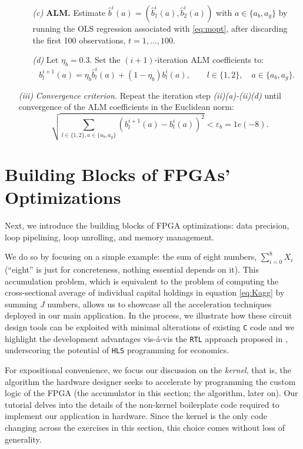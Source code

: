 \documentclass[12pt,american]{article}
\newcommand{\tollbetacode}{1e(-8)}
\begin{document}
\begin{itemize}
\begin{itemize}
\item [\textit{(c)}] \textbf{ALM.} Estimate $\hat{b}^{i}(a)=(\hat{b}^{i}_1(a),\hat{b}^{i}_2(a))$ with $a\in\{a_b,a_g\}$ by running the OLS regression associated with \eqref{eq:mopt}, after discarding the first 100 observations, $t=1,\ldots,100$.
\item [\textit{(d)}] Let $\eta_{b}=0.3$. Set the $(i+1)$-iteration ALM coefficients to:
\begin{equation*}
b^{i+1}_{l}(a)=\eta_{b}\hat{b}^{i}_{l}(a)+(1-\eta_{b})b^{i}_{l}(a), \qquad l\in\{1,2\}, \quad a\in\{a_b,a_g\}.  
\end{equation*}
\end{itemize}
\item [\textit{(iii)}] \textit{Convergence criterion.} Repeat the iteration step \textit{(ii)(a)-(ii)(d)} until convergence of the ALM coefficients in the Euclidean norm:
\begin{equation}
\sqrt{\sum\limits_{l\in\{1,2\},a\in\{a_b,a_g\}}(b^{i+1}_{l}(a)-b^{i}_{l}(a))^2}<\varepsilon_b =\tollbetacode.\label{eq:betaconv}
\end{equation}
\end{itemize}

\section{Building Blocks of FPGAs' Optimizations}\label{sec:buiblo}

Next, we introduce the building blocks of FPGA optimizations: data precision, loop pipelining, loop unrolling, and memory management. 

We do so by focusing on a simple example: the sum of eight numbers, $\sum_{i=0}^{8} X_i$ (``eight'' is just for concreteness, nothing essential depends on it). This accumulation problem, which is equivalent to the problem of computing the cross-sectional average of individual capital holdings in equation \eqref{eq:Kagg} by summing $J$ numbers, allows us to showcase all the acceleration techniques deployed in our main application. In the process, we illustrate how these circuit design tools can be exploited with minimal alterations of existing \texttt{C} code and we highlight the development advantages vis-\'a-vis the \texttt{RTL} approach proposed in \cite{Peri2020}, underscoring the potential of \texttt{HLS} programming for economics.

For expositional convenience, we focus our discussion on the \textit{kernel}, that is, the algorithm the hardware designer seeks to accelerate by programming the custom logic of the FPGA (the accumulator in this section; the \citet{KrusellSmith1998} algorithm, later on). Our tutorial \citep{FPGAtutorial23} delves into the details of the non-kernel boilerplate code required to implement our application in hardware. Since the kernel is the only code changing across the exercises in this section, this choice comes without loss of generality.
\end{document}
